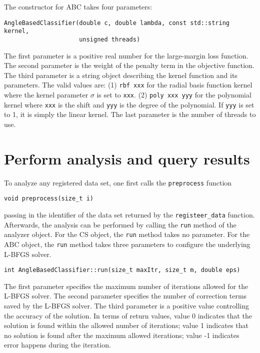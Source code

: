 The constructor for ABC takes four parameters:
\begin{lstlisting}
AngleBasedClassifier(double c, double lambda, const std::string kernel,
                     unsigned threads)
\end{lstlisting}
The first parameter is a positive real number for the large-margin loss function.
The second parameter is the weight of the penalty term in the objective function.
The third parameter is a string object describing the kernel function and its
parameters. The valid values are: (1) {\tt rbf xxx} for the radial basis function
kernel where the kernel parameter $\sigma$ is set to {\tt xxx}. (2)
{\tt poly xxx yyy} for the polynomial kernel where {\tt xxx} is the shift and
{\tt yyy} is the degree of the polynomial. If {\tt yyy} is set to 1, it is simply
the linear kernel. The last parameter is the number of threads to use. 

\section{Perform analysis and query results}
To analyze any registered data set, one first calls the {\tt preprocess} function 
\begin{lstlisting}
void preprocess(size_t i)
\end{lstlisting}   
passing in the identifier of the data set returned by the {\tt registeer\_data}
function. Afterwards, the analysis can be performed by calling the {\tt run} method
of the analyzer object. For the CS object, the {\tt run} method takes no parameter.
For the ABC object, the {\tt run} method takes three parameters to configure the
underlying L-BFGS solver.
\begin{lstlisting}
int AngleBasedClassifier::run(size_t maxItr, size_t m, double eps)
\end{lstlisting}
The first parameter specifies the maximum number of iterations allowed for the
L-BFGS solver. The second parameter specifies the number of correction terms
saved by the L-BFGS solver. The third parameter is a positive value controlling
the accuracy of the solution. In terms of return values, value 0 indicates that
the solution is found within the allowed number of iterations; value 1 indicates
that no solution is found after the maximum allowed iterations; value -1
indicates error happens during the iteration. 

